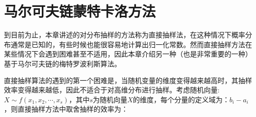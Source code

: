 \section{马尔可夫链蒙特卡洛方法}
到目前为止，本章讲述的对分布抽样的方法称为直接抽样法，在这种情况下概率分布通常是已知的，有些时候也能很容易地计算出归一化常数。然而直接抽样方法在某些情况下会遇到困难甚至不适用，因此本章介绍另一种（也是非常重要的一种）基于马尔可夫链的梅特罗波利斯算法。

直接抽样算法的遇到的第一个困难是，当随机变量的维度变得越来越高时，其抽样效率变得越来越低，因此不适合于对高维分布进行抽样。考虑随机向量: $X\sim f(x_1,x_2,\cdots,x_s )$，其中$s$为随机向量$X$的维度，每个分量的定义域为：$b_i-a_i$，则直接抽样方法中取舍抽样的效率为：

